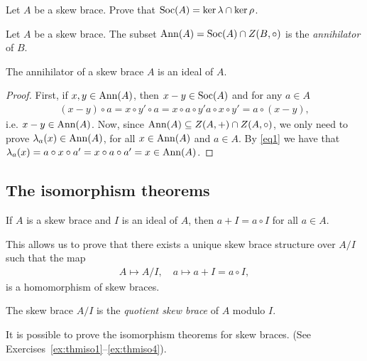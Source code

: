     \begin{exercise}
        Let $A$ be a skew brace. Prove that $\operatorname{Soc}(A)=\ker \lambda \cap \ker \rho$.
    \end{exercise}

    \begin{definition}
         Let $A$ be a skew brace. The subset $\operatorname{Ann}(A) = \operatorname{Soc}(A) \cap Z(B, \circ)$ is the
        \emph{annihilator} of $B$.
    \end{definition}

    \begin{proposition}
         The annihilator of a skew brace $A$ is an ideal of $A$.
    \end{proposition}

    \begin{proof}
        First, if $x,y\in \operatorname{Ann}(A)$, then $x-y\in \operatorname{Soc}(A)$ and for any $a\in A$
        \begin{align*}
            (x-y)\circ a = x\circ y' \circ a = x\circ a\circ y' a\circ x \circ y' = a\circ (x-y),
        \end{align*}
        i.e. $x-y\in \operatorname{Ann}(A)$. Now, since $\operatorname{Ann}(A)\subseteq Z(A,+)\cap Z(A,\circ)$, we only need to prove $\lambda_a(x)\in \operatorname{Ann}(A)$, for all $x\in \operatorname{Ann}(A)$ and $a\in A$. By \eqref{eq1} we have that $\lambda_a(x)=a\circ x\circ a'= x\circ a \circ a' = x\in \operatorname{Ann}(A)$. 
    \end{proof}

    \subsection{The isomorphism theorems}

    If $A$ is a skew brace and $I$ is an ideal of $A$, then $a+I = a\circ I$ for all $a\in A$. 
    
    This allows us to prove that there exists a unique skew brace structure over $A/I$ such that the map
    \begin{align*}
        A\mapsto A/I, \quad a\mapsto a+I=a\circ I,
    \end{align*}
    is a homomorphism of skew braces. 
    
    \begin{definition}
        The skew brace $A/I$ is the \emph{quotient skew brace} of $A$ modulo $I$. 
    \end{definition}
    
    
    It is possible to prove the isomorphism theorems for skew braces. (See Exercises~\ref{ex:thmiso1}--\ref{ex:thmiso4}).
